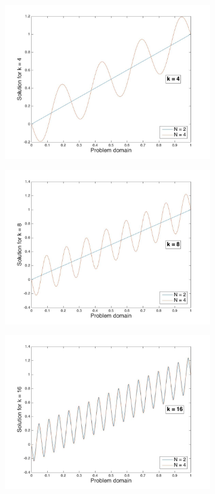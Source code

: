 \documentclass[10pt]{article}
\begin{document}
\begin{figure}[H]
\begin{subfigure}{.35\textwidth}
  \includegraphics[width=1.0\linewidth]{Nplot_for_k_4.jpg}
  \caption{}
\end{subfigure}
\begin{subfigure}{.35\textwidth}
  \centering
  \includegraphics[width=1.0\linewidth]{Nplot_for_k_8.jpg}
  \caption{}
\end{subfigure}
\begin{subfigure}{.35\textwidth}
  \centering
  \includegraphics[width=1.0\linewidth]{Nplot_for_k_16.jpg}

\end{subfigure}
\end{figure}
\end{document}
